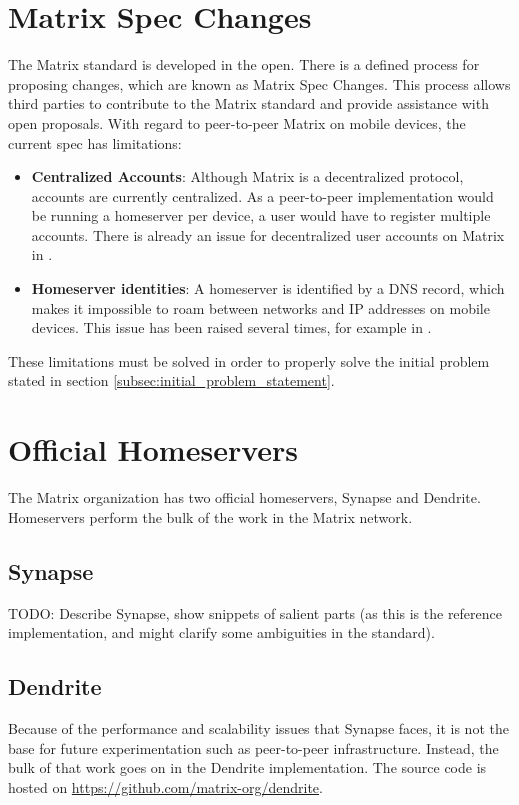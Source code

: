 \section{Matrix Spec Changes}
The Matrix standard is developed in the open.
There is a defined process for proposing changes, which are known as Matrix Spec Changes\cite{matrix_org_spec_changes}.
This process allows third parties to contribute to the Matrix standard and provide assistance with open proposals.
With regard to peer-to-peer Matrix on mobile devices, the current spec has limitations:
\begin{itemize}
    \item{
        \textbf{Centralized Accounts}: 
        Although Matrix is a decentralized protocol, accounts are currently centralized.
        As a peer-to-peer implementation would be running a homeserver per device, a user would have to register multiple accounts.
        There is already an issue for decentralized user accounts on Matrix in .
    }
    \item{
        \textbf{Homeserver identities}:
        A homeserver is identified by a DNS record, which makes it impossible to roam between networks and IP addresses on mobile devices.
        This issue has been raised several times, for example in .
    }
\end{itemize}
These limitations must be solved in order to properly solve the initial problem stated in section \ref{subsec:initial_problem_statement}.

\section{Official Homeservers}
The Matrix organization has two official homeservers, Synapse\cite{matrix_org_synapse} and Dendrite\cite{matrix_org_dendrite}.
Homeservers perform the bulk of the work in the Matrix network.

\subsection{Synapse}
TODO:
    Describe Synapse, show snippets of salient parts (as this is the reference implementation, and might clarify some ambiguities in the standard).

\subsection{Dendrite}
Because of the performance and scalability issues that Synapse faces, it is not the base for future experimentation such as peer-to-peer infrastructure.
Instead, the bulk of that work goes on in the Dendrite implementation.
The source code is hosted on \url{https://github.com/matrix-org/dendrite}.

